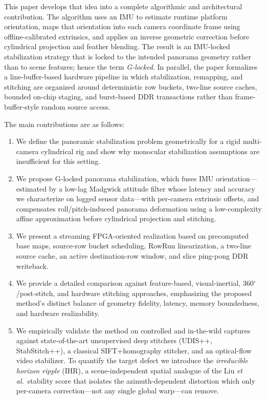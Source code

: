 \documentclass[journal]{IEEEtran}
\newcommand{\etal}{\textit{et al.}}
\begin{document}
This paper develops that idea into a complete algorithmic and architectural contribution. The algorithm uses an IMU to estimate runtime platform orientation, maps that orientation into each camera coordinate frame using offline-calibrated extrinsics, and applies an inverse geometric correction before cylindrical projection and feather blending. The result is an IMU-locked stabilization strategy that is locked to the intended panorama geometry rather than to scene features; hence the term \emph{G-locked}. In parallel, the paper formalizes a line-buffer-based hardware pipeline in which stabilization, remapping, and stitching are organized around deterministic row buckets, two-line source caches, bounded on-chip staging, and burst-based DDR transactions rather than frame-buffer-style random source access.

The main contributions are as follows:
\begin{enumerate}[leftmargin=*,itemsep=0pt,topsep=2pt]
  \item We define the panoramic stabilization problem geometrically for a rigid multi-camera cylindrical rig and show why monocular stabilization assumptions are insufficient for this setting.
  \item We propose G-locked panorama stabilization, which fuses IMU orientation---estimated by a low-lag Madgwick attitude filter whose latency and accuracy we characterize on logged sensor data---with per-camera extrinsic offsets, and compensates roll/pitch-induced panorama deformation using a low-complexity affine approximation before cylindrical projection and stitching.
  \item We present a streaming FPGA-oriented realization based on precomputed base maps, source-row bucket scheduling, RowRun linearization, a two-line source cache, an active destination-row window, and slice ping-pong DDR writeback.
  \item We provide a detailed comparison against feature-based, visual-inertial, 360$^\circ$/post-stitch, and hardware stitching approaches, emphasizing the proposed method's distinct balance of geometry fidelity, latency, memory boundedness, and hardware realizability.
  \item We empirically validate the method on controlled and in-the-wild captures against state-of-the-art unsupervised deep stitchers (UDIS++, StabStitch++), a classical SIFT$+$homography stitcher, and an optical-flow video stabilizer. To quantify the target defect we introduce the \emph{irreducible horizon ripple} (IHR), a scene-independent spatial analogue of the Liu \etal\ stability score that isolates the azimuth-dependent distortion which only per-camera correction---not any single global warp---can remove.
\end{enumerate}
\end{document}
